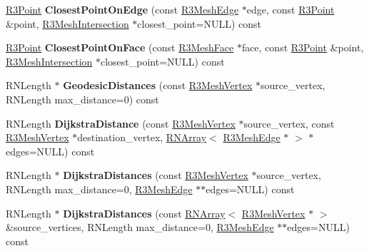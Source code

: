 \begin{DoxyCompactItemize}
\item 
\hyperlink{class_r3_point}{R3\+Point} {\bfseries Closest\+Point\+On\+Edge} (const \hyperlink{class_r3_mesh_edge}{R3\+Mesh\+Edge} $\ast$edge, const \hyperlink{class_r3_point}{R3\+Point} \&point, \hyperlink{struct_r3_mesh_intersection}{R3\+Mesh\+Intersection} $\ast$closest\+\_\+point=N\+U\+LL) const \hypertarget{class_r3_mesh_a33ed84d9a3eb6dd0d89759d08980e5cc}{}\label{class_r3_mesh_a33ed84d9a3eb6dd0d89759d08980e5cc}

\item 
\hyperlink{class_r3_point}{R3\+Point} {\bfseries Closest\+Point\+On\+Face} (const \hyperlink{class_r3_mesh_face}{R3\+Mesh\+Face} $\ast$face, const \hyperlink{class_r3_point}{R3\+Point} \&point, \hyperlink{struct_r3_mesh_intersection}{R3\+Mesh\+Intersection} $\ast$closest\+\_\+point=N\+U\+LL) const \hypertarget{class_r3_mesh_a7c40af09ff0e52e12f3c0d8e3d8e64ae}{}\label{class_r3_mesh_a7c40af09ff0e52e12f3c0d8e3d8e64ae}

\item 
R\+N\+Length $\ast$ {\bfseries Geodesic\+Distances} (const \hyperlink{class_r3_mesh_vertex}{R3\+Mesh\+Vertex} $\ast$source\+\_\+vertex, R\+N\+Length max\+\_\+distance=0) const \hypertarget{class_r3_mesh_a933b9efb4093d51d02054ec91aada957}{}\label{class_r3_mesh_a933b9efb4093d51d02054ec91aada957}

\item 
R\+N\+Length {\bfseries Dijkstra\+Distance} (const \hyperlink{class_r3_mesh_vertex}{R3\+Mesh\+Vertex} $\ast$source\+\_\+vertex, const \hyperlink{class_r3_mesh_vertex}{R3\+Mesh\+Vertex} $\ast$destination\+\_\+vertex, \hyperlink{class_r_n_array}{R\+N\+Array}$<$ \hyperlink{class_r3_mesh_edge}{R3\+Mesh\+Edge} $\ast$ $>$ $\ast$edges=N\+U\+LL) const \hypertarget{class_r3_mesh_ae95f4c503ff2cd2e03a72a45e8634474}{}\label{class_r3_mesh_ae95f4c503ff2cd2e03a72a45e8634474}

\item 
R\+N\+Length $\ast$ {\bfseries Dijkstra\+Distances} (const \hyperlink{class_r3_mesh_vertex}{R3\+Mesh\+Vertex} $\ast$source\+\_\+vertex, R\+N\+Length max\+\_\+distance=0, \hyperlink{class_r3_mesh_edge}{R3\+Mesh\+Edge} $\ast$$\ast$edges=N\+U\+LL) const \hypertarget{class_r3_mesh_ae366a98cb07f779b9828c5f31ae42d10}{}\label{class_r3_mesh_ae366a98cb07f779b9828c5f31ae42d10}

\item 
R\+N\+Length $\ast$ {\bfseries Dijkstra\+Distances} (const \hyperlink{class_r_n_array}{R\+N\+Array}$<$ \hyperlink{class_r3_mesh_vertex}{R3\+Mesh\+Vertex} $\ast$ $>$ \&source\+\_\+vertices, R\+N\+Length max\+\_\+distance=0, \hyperlink{class_r3_mesh_edge}{R3\+Mesh\+Edge} $\ast$$\ast$edges=N\+U\+LL) const \hypertarget{class_r3_mesh_ac28bfad3bd911c6bdd9acb6b36e4b075}{}\label{class_r3_mesh_ac28bfad3bd911c6bdd9acb6b36e4b075}


\end{DoxyCompactItemize}
